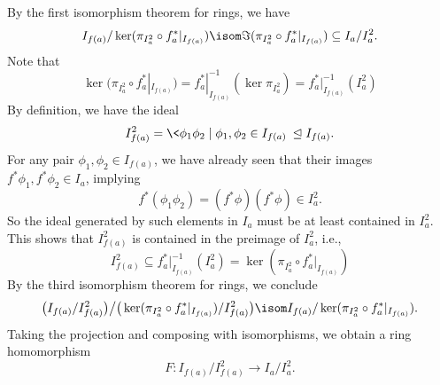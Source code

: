 \documentclass[12pt]{article}
\let\teq\trianglelefteq
\begin{document}
By the first isomorphism theorem for rings, we have
\[
    I_{f(a)}/\ker(\pi_{I_a^2} \circ f^*_a|_{I_{f(a)}}) \isom \Im(\pi_{I_a^2} \circ f^*_a|_{I_{f(a)}}) \subseteq I_a/I_a^2.
\]
Note that
\[
    \ker(\pi_{I_a^2} \circ f^*_a|_{I_{f(a)}})
        = f^*_a|_{I_{f(a)}}^{-1}(\ker \pi_{I_a^2})
        = f^*_a|_{I_{f(a)}}^{-1}(I_a^2)
\]
By definition, we have the ideal
\[
    I_{f(a)}^2 = \<\phi_1\phi_2 \mid \phi_1, \phi_2 \in I_{f(a)}\> \teq I_{f(a)}.
\]
For any pair $\phi_1, \phi_2 \in I_{f(a)}$, we have already seen that their images $f^*\phi_1, f^*\phi_2 \in I_a$, implying
\[
    f^*(\phi_1\phi_2) = (f^*\phi)(f^*\phi) \in I_a^2.
\]
So the ideal generated by such elements in $I_a$ must be at least contained in $I_a^2$. This shows that $I_{f(a)}^2$ is contained in the preimage of $I_a^2$, i.e.,
\[
    I_{f(a)}^2 \subseteq f^*_a|_{I_{f(a)}}^{-1}(I_a^2) = \ker(\pi_{I_a^2} \circ f^*_a|_{I_{f(a)}})
\]
By the third isomorphism theorem for rings, we conclude
\[
    \big(I_{f(a)}/I_{f(a)}^2\big) \big/ \big(\ker(\pi_{I_a^2} \circ f^*_a|_{I_{f(a)}})/I_{f(a)}^2\big) 
    \isom I_{f(a)}/\ker(\pi_{I_a^2} \circ f^*_a|_{I_{f(a)}}).
\]
Taking the projection and composing with isomorphisms, we obtain a ring homomorphism
\[
    F : I_{f(a)}/I_{f(a)}^2 \to I_a/I_a^2.
\]
\end{document}

